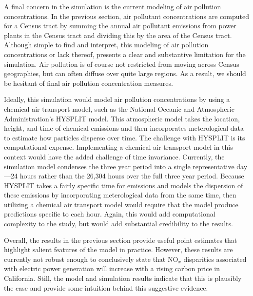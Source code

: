 A final concern in the simulation is the current modeling of air pollution concentrations. In the previous section, air pollutant concentrations are computed for a Census tract by summing the annual air pollutant emissions from power plants in the Census tract and dividing this by the area of the Census tract. Although simple to find and interpret, this modeling of air pollution concentrations or lack thereof, presents a clear and substantive limitation for the simulation. Air pollution is of course not restricted from moving across Census geographies, but can often diffuse over quite large regions. As a result, we should be hesitant of final air pollution concentration measures. 

Ideally, this simulation would model air pollution concentrations by using a chemical air transport model, such as the National Oceanic and Atmospheric Administration's HYSPLIT model. This atmospheric model takes the location, height, and time of chemical emissions and then incorporates meterological data to estimate how particles disperse over time. The challenge with HYSPLIT is its computational expense. Implementing a chemical air transport model in this context would have the added challenge of time invariance. Currently, the simulation model condenses the three year period into a single representative day---24 hours rather than the 26,304 hours over the full three year period. Because HYSPLIT takes a fairly specific time for emissions and models the dispersion of these emissions by incorporating meterological data from the same time, then utilizing a chemical air transport model would require that the model produce predictions specific to each hour. Again, this would add computational complexity to the study, but would add substantial credibility to the results.

Overall, the results in the previous section provide useful point estimates that highlight salient features of the model in practice. However, these results are currently not robust enough to conclusively state that NO$_x$ disparities associated with electric power generation will increase with a rising carbon price in California. Still, the model and simulation results indicate that this is plausibly the case and provide some intuition behind this suggestive evidence. 